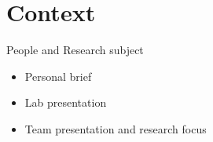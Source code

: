 \section{Context}
\begin{frame}{People and Research subject}
    \begin{itemize}
        \item Personal brief
        \item Lab presentation
        \item Team presentation and research focus
    \end{itemize}
\end{frame}
